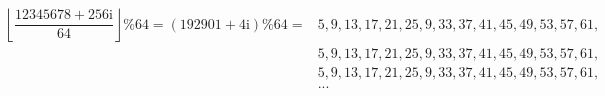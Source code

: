 \documentclass[10pt]{article}
\begin{document}
\begin{align*}
  \mathrm{\left\lfloor \dfrac{12345678+256i}{64} \right\rfloor \% 64 = \left(192901 + 4i \right)} \% 64 = &5,9,13,17,21,25,9,33,37,41,45,49,53,57,61, \\
                                                                                                          &5,9,13,17,21,25,9,33,37,41,45,49,53,57,61, \\
                                                                                                          &5,9,13,17,21,25,9,33,37,41,45,49,53,57,61, \\
                                                                                                          &...
\end{align*}
\end{document}

